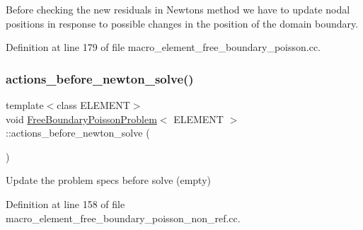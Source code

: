 Before checking the new residuals in Newton\textquotesingle{}s method we have to update nodal positions in response to possible changes in the position of the domain boundary. 



Definition at line 179 of file macro\+\_\+element\+\_\+free\+\_\+boundary\+\_\+poisson.\+cc.

\mbox{\label{classFreeBoundaryPoissonProblem_aeef57bd5dc79b6aba9eeadcd0c01a2e0}} 
\subsubsection{\texorpdfstring{actions\+\_\+before\+\_\+newton\+\_\+solve()}{actions\_before\_newton\_solve()}\hspace{0.1cm}{\footnotesize\ttfamily [1/2]}}
{\footnotesize\ttfamily template$<$class E\+L\+E\+M\+E\+NT$>$ \\
void \hyperlink{classFreeBoundaryPoissonProblem}{Free\+Boundary\+Poisson\+Problem}$<$ E\+L\+E\+M\+E\+NT $>$\+::actions\+\_\+before\+\_\+newton\+\_\+solve (\begin{DoxyParamCaption}{ }\end{DoxyParamCaption})\hspace{0.3cm}{\ttfamily [inline]}}



Update the problem specs before solve (empty) 



Definition at line 158 of file macro\+\_\+element\+\_\+free\+\_\+boundary\+\_\+poisson\+\_\+non\+\_\+ref.\+cc.

\mbox{\label{classFreeBoundaryPoissonProblem_aeef57bd5dc79b6aba9eeadcd0c01a2e0}} 
